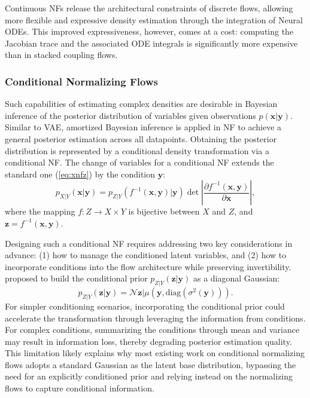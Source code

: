 Continuous \acp{NF} release the architectural constraints of discrete flows, allowing more flexible and expressive density estimation through the integration of Neural \acp{ODE}. This improved expressiveness, however, comes at a cost: computing the Jacobian trace and the associated ODE integrals is significantly more expensive than in stacked coupling flows.

\subsubsection{Conditional Normalizing Flows}
\label{sec:condnf}
Such capabilities of estimating complex densities are desirable in Bayesian inference of the posterior distribution of variables given observations $p(\boldsymbol{x}|\boldsymbol{y})$. Similar to \ac{VAE}, amortized Bayesian inference \citep{radev2021diss} is applied in \ac{NF} to achieve a general posterior estimation across all datapoints. Obtaining the posterior distribution is represented by a conditional density transformation via a conditional \ac{NF}. The change of variables for a conditional NF extends the standard one (\ref{eq:xnfz}) by the condition $\boldsymbol{y}$:
\begin{equation}
    p_{X|Y}(\boldsymbol{x}|\boldsymbol{y}) = p_{Z|Y}(f^{-1}(\boldsymbol{x},\boldsymbol{y})|\boldsymbol{y})\det\left|\frac{\partial f^{-1}(\boldsymbol{x},\boldsymbol{y})}{\partial\boldsymbol{x}}\right|,
\end{equation}
where the mapping $f:Z\rightarrow X\times Y$ is bijective between $X$ and $Z$, and $\boldsymbol{z}=f^{-1}(\boldsymbol{x},\boldsymbol{y})$.

Designing such a conditional NF requires addressing two key considerations in advance: (1) how to manage the conditioned latent variables, and (2) how to incorporate conditions into the flow architecture while preserving invertibility. \citeauthor{winkler2023cnf} \citeyearpar{winkler2023cnf} proposed to build the conditional prior $p_{Z|Y}(\boldsymbol{z}|\boldsymbol{y})$ as a diagonal Gaussian:
\begin{equation}
    p_{Z|Y}(\boldsymbol{z}|\boldsymbol{y}) = \mathcal{N}{\boldsymbol{z}|\mu(\boldsymbol{y}, \text{diag}(\sigma^2(\boldsymbol{y})))}.
\end{equation}
For simpler conditioning scenarios, incorporating the conditional prior could accelerate the transformation through leveraging the information from conditions. For complex conditions, summarizing the conditions through mean and variance may result in information loss, thereby degrading posterior estimation quality. This limitation likely explains why most existing work on conditional normalizing flows adopts a standard Gaussian as the latent base distribution, bypassing the need for an explicitly conditioned prior and relying instead on the normalizing flows to capture conditional information.


